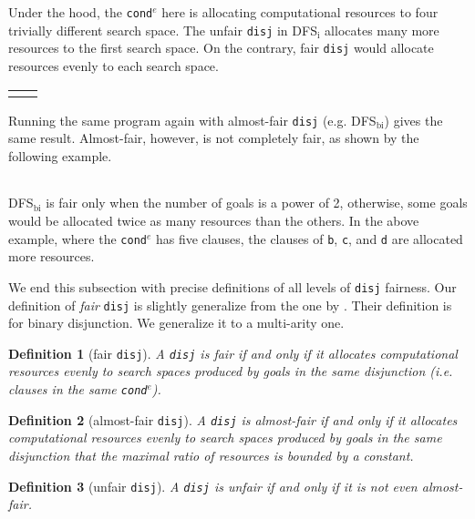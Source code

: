 \documentclass[format=acmlarge, review=true, authordraft=true]{acmart}
\newcommand{\conde}{\texttt{cond$^e$}}
\newcommand{\disj}{\texttt{disj}}
\newcommand{\DFSi }[0]{DFS$_\textrm{i}$}
\newcommand{\DFSbi}[0]{DFS$_\textrm{bi}$}
\newtheorem{defn}{Definition}[section]
\begin{document}
Under the hood, the \conde{} here is allocating computational resources to 
four trivially different search space. The unfair \disj{} in 
\DFSi{} allocates many more resources to the first search space. On the 
contrary, fair \disj{} would allocate resources evenly to each search space. 

\begin{center}
	\begin{tabular}{l|r}
		 &
		
	\end{tabular}
\end{center}

Running the same program again with almost-fair \disj {} (e.g. 
DFS$_\textrm{bi}$) gives the same result. Almost-fair, however, is not 
completely fair, as shown by the following example. 

\begin{center}
	\begin{tabular}{c}
		
	\end{tabular}
\end{center}

\DFSbi{} is fair only when the number of goals is a power of 2, 
otherwise, some goals would be allocated twice as many resources than the 
others. In the above example, where the \conde{} has five clauses, the clauses 
of \texttt{b}, \texttt{c}, and \texttt{d} are allocated more resources.

We end this subsection with precise definitions of all levels of 
\disj{} fairness. Our definition of \emph{fair} \disj{} is slightly generalize 
from the one by \citet{seres1999algebra}. Their definition is for binary 
disjunction. We generalize it to a multi-arity one.

\begin{defn}[fair \disj{}]
A \disj{} is fair if and only if it allocates computational resources evenly to 
search spaces produced by goals in the same disjunction (i.e. clauses in 
the same \conde).
\end{defn}

\begin{defn}[almost-fair \disj{}]
A \disj{} is almost-fair if and only if it allocates computational resources
evenly to search spaces produced by goals in the same disjunction that 
the maximal ratio of resources is bounded by a constant.
\end{defn}

\begin{defn}[unfair \disj{}]
A \disj{} is unfair if and only if it is not even almost-fair.
\end{defn}
\end{document}
